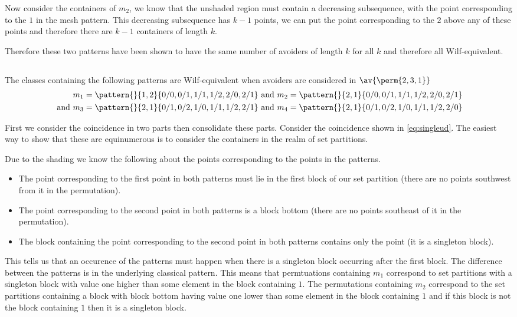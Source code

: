 Now consider the containers of \(m_2\), we know that the unshaded region
must contain a decreasing subsequence, with the point corresponding to
the \(1\) in the mesh pattern. This decreasing subsequence has \(k-1\)
points, we can put the point corresponding to the \(2\) above any of these
points and therefore there are \(k-1\) containers of length \(k\).

Therefore these two patterns have been shown to have the same number of
avoiders of length \(k\) for all \(k\) and therefore all Wilf-equivalent.

\subsection{}
The classes containing the following patterns are Wilf-equivalent
when avoiders are considered in \(\av{\perm{2,3,1}}\)
\begin{align}
    m_1 = \pattern{}{1,2}{0/0,0/1,1/1,1/2,2/0,2/1} &\text{ and }
    m_2 = \pattern{}{2,1}{0/0,0/1,1/1,1/2,2/0,2/1} \label{eq:singleud}\\
    \text{ and }
    m_3 = \pattern{}{2,1}{0/1,0/2,1/0,1/1,1/2,2/1} &\text{ and }
    m_4 = \pattern{}{2,1}{0/1,0/2,1/0,1/1,1/2,2/0} \label{eq:other}
\end{align}

First we consider the coincidence in two parts then consolidate these parts.
Consider the coincidence shown in \eqref{eq:singleud}. The easiest way to
show that these are equinumerous is to consider the containers in the realm
of set partitions.

Due to the shading we know the following about the points corresponding
to the points in the patterns.
\begin{itemize}
    \item The point corresponding to the first point in both patterns
        must lie in the first block of our set partition (there are
        no points southwest from it in the permutation).
    \item The point corresponding to the second point in both patterns
        is a block bottom (there are no points southeast of it in
        the permutation).
    \item The block containing the point corresponding to the second
        point in both patterns contains only the point (it is a singleton
        block).
\end{itemize}
This tells us that an occurence of the patterns must happen when there
is a singleton block occurring after the first block. The difference
between the patterns is in the underlying classical pattern. This
means that permtuations containing \(m_1\) correspond to set partitions
with a singleton block with value one higher than some element in the
block containing \(1\). The permutations containing \(m_2\) correspond
to the set partitions containing a block with block bottom having value
one lower than some element in the block containing \(1\) and if this
block is not the block containing \(1\) then it is a singleton block.

